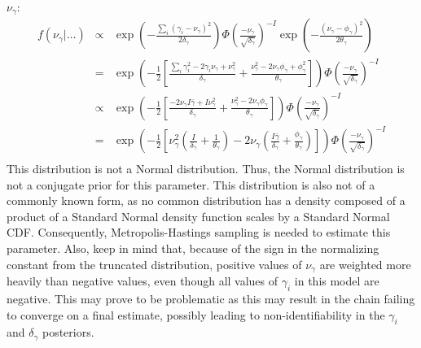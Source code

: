 $\nu_{\gamma}$:\\
\begin{eqnarray*}
f(\nu_{\gamma}|\dots)&\propto&\exp\left(-\frac{\sum_i\left(\gamma_i-\nu_{\gamma}\right)^2}{2\delta_{\gamma}}\right)\Phi\left(\frac{-\nu_{\gamma}}{\sqrt{\delta_{\gamma}}}\right)^{-I}\exp\left(-\frac{(\nu_{\gamma}-\phi_{\gamma})^2}{2\theta_{\gamma}}\right)\\
&=&\exp\left(-\frac{1}{2}\left[\frac{\sum_i\gamma_i^2-2\gamma_i\nu_{\gamma}+\nu_{\gamma}^2}{\delta_{\gamma}}+\frac{\nu_{\gamma}^2-2\nu_{\gamma}\phi_{\gamma}+\phi_{\gamma}^2}{\theta_{\gamma}}\right]\right)\Phi\left(\frac{-\nu_{\gamma}}{\sqrt{\delta_{\gamma}}}\right)^{-I}\\
&\propto&\exp\left(-\frac{1}{2}\left[\frac{-2\nu_{\gamma}I\bar{\gamma}+I\nu_{\gamma}^2}{\delta_{\gamma}}+\frac{\nu_{\gamma}^2-2\nu_{\gamma}\phi_{\gamma}}{\theta_{\gamma}}\right]\right)\Phi\left(\frac{-\nu_{\gamma}}{\sqrt{\delta_{\gamma}}}\right)^{-I}\\
&=&\exp\left(-\frac{1}{2}\left[\nu_{\gamma}^2\left(\frac{I}{\delta_{\gamma}}+\frac{1}{\theta_{\gamma}}\right)-2\nu_{\gamma}\left(\frac{I\bar{\gamma}}{\delta_{\gamma}}+\frac{\phi_{\gamma}}{\theta_{\gamma}}\right)\right]\right)\Phi\left(\frac{-\nu_{\gamma}}{\sqrt{\delta_{\gamma}}}\right)^{-I}\\
\end{eqnarray*}
This distribution is not a Normal distribution.  Thus, the Normal
distribution is not a conjugate prior for this parameter.  This
distribution is also not of a commonly known form, as no common
distribution has a density composed of a product of a Standard Normal
density function scales by a Standard Normal CDF.  Consequently,
Metropolis-Hastings sampling is needed to estimate this parameter.
Also, keep in mind that, because of the sign in the normalizing
constant from the truncated distribution, positive values of
$\nu_{\gamma}$ are weighted more heavily than negative values, even
though all values of $\gamma_i$ in this model are negative.  This may
prove to be problematic as this may result in the chain failing to
converge on a final estimate, possibly leading to non-identifiability
in the $\gamma_i$ and $\delta_{\gamma}$ posteriors.\\

